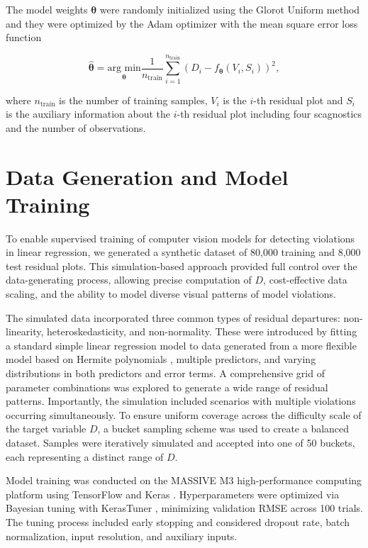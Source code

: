 \documentclass[]{interact}
\theoremstyle{plain}%
\theoremstyle{definition}
\theoremstyle{remark}
\begin{document}
The model weights \(\boldsymbol{\theta}\) were randomly initialized
using the Glorot Uniform method \citep{glorot2010understanding} and they
were optimized by the Adam optimizer \citep{kingma2014adam} with the
mean square error loss function

\[\hat{\boldsymbol{\theta}} = \underset{\boldsymbol{\theta}}{\text{arg min}}\frac{1}{n_{\text{train}}}\sum_{i=1}^{n_{\text{train}}}(D_i - f_{\boldsymbol{\theta}}(V_i, S_i))^2,\]

\noindent where \(n_{\text{train}}\) is the number of training samples,
\(V_i\) is the \(i\)-th residual plot and \(S_i\) is the auxiliary
information about the \(i\)-th residual plot including four scagnostics
and the number of observations.

\section{Data Generation and Model
Training}\label{sec-model-data-generation}

To enable supervised training of computer vision models for detecting
violations in linear regression, we generated a synthetic dataset of
80,000 training and 8,000 test residual plots. This simulation-based
approach provided full control over the data-generating process,
allowing precise computation of \(D\), cost-effective data scaling, and
the ability to model diverse visual patterns of model violations.

The simulated data incorporated three common types of residual
departures: non-linearity, heteroskedasticity, and non-normality. These
were introduced by fitting a standard simple linear regression model to
data generated from a more flexible model based on Hermite polynomials
\citep{hermite1864nouveau}, multiple predictors, and varying
distributions in both predictors and error terms. A comprehensive grid
of parameter combinations was explored to generate a wide range of
residual patterns. Importantly, the simulation included scenarios with
multiple violations occurring simultaneously. To ensure uniform coverage
across the difficulty scale of the target variable \(D\), a bucket
sampling scheme was used to create a balanced dataset. Samples were
iteratively simulated and accepted into one of 50 buckets, each
representing a distinct range of \(D\).

Model training was conducted on the MASSIVE M3 high-performance
computing platform \citep{goscinski2014multi} using TensorFlow
\citep{abadi2016tensorflow} and Keras \citep{chollet2015keras}.
Hyperparameters were optimized via Bayesian tuning with KerasTuner
\citep{omalley2019kerastuner}, minimizing validation RMSE across 100
trials. The tuning process included early stopping and considered
dropout rate, batch normalization, input resolution, and auxiliary
inputs.
\end{document}
